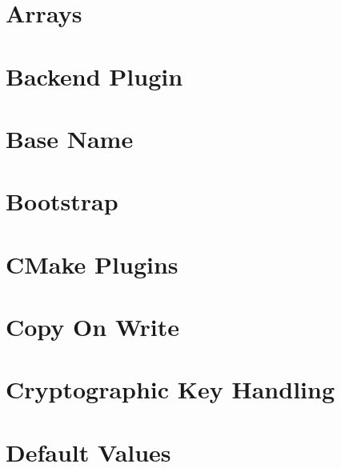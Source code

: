 \let\mypdfximage\pdfximage\def\pdfximage{\immediate\mypdfximage}\documentclass[twoside]{book}
\newcommand{\+}{\discretionary{\mbox{\scriptsize$\hookleftarrow$}}{}{}}
\begin{document}
\chapter{Arrays}
\label{doc_decisions_5_partially_implemented_warning_array_md}

\chapter{Backend Plugin}
\label{doc_decisions_6_implemented_backend_plugin_md}

\chapter{Base Name}
\label{doc_decisions_6_implemented_base_name_md}

\chapter{Bootstrap}
\label{doc_decisions_6_implemented_bootstrap_md}

\chapter{CMake Plugins}
\label{doc_decisions_6_implemented_cmake_plugins_md}

\chapter{Copy On Write}
\label{doc_decisions_6_implemented_copy_on_write_md}

\chapter{Cryptographic Key Handling}
\label{doc_decisions_6_implemented_cryptograhic_key_handling_md}

\chapter{Default Values}
\label{doc_decisions_6_implemented_default_values_md}

\end{document}
